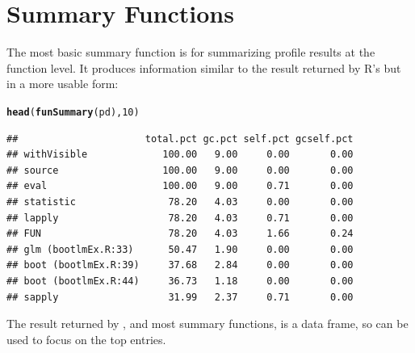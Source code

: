 \documentclass[nojss]{jss}\usepackage[]{graphicx}\usepackage[]{color}
\makeatletter
\newcommand{\hlnum}[1]{\textcolor[rgb]{0.686,0.059,0.569}{#1}}%
\newcommand{\hlstd}[1]{\textcolor[rgb]{0.345,0.345,0.345}{#1}}%
\newcommand{\hlkwd}[1]{\textcolor[rgb]{0.737,0.353,0.396}{\textbf{#1}}}%
\newenvironment{kframe}{%
 \def\at@end@of@kframe{}%
 \ifinner\ifhmode%
  \def\at@end@of@kframe{\end{minipage}}%
  \begin{minipage}{\columnwidth}%
 \fi\fi%
 \def\FrameCommand##1{\hskip\@totalleftmargin \hskip-\fboxsep
 \colorbox{shadecolor}{##1}\hskip-\fboxsep
     \hskip-\linewidth \hskip-\@totalleftmargin \hskip\columnwidth}%
 \MakeFramed {\advance\hsize-\width
   \@totalleftmargin\z@ \linewidth\hsize
   \@setminipage}}%
 {\par\unskip\endMakeFramed%
 \at@end@of@kframe}
\newenvironment{knitrout}{}{} %
\makeatother
\begin{document}
\section{Summary Functions}
The most basic summary function is  for summarizing
profile results at the function level. It produces information similar
to the result returned by R's  but in a more usable
form:
\begin{knitrout}\small
{}\color{fgcolor}\begin{kframe}
\begin{alltt}
\hlkwd{head}\hlstd{(}\hlkwd{funSummary}\hlstd{(pd),} \hlnum{10}\hlstd{)}
\end{alltt}
\begin{verbatim}
##                      total.pct gc.pct self.pct gcself.pct
## withVisible             100.00   9.00     0.00       0.00
## source                  100.00   9.00     0.00       0.00
## eval                    100.00   9.00     0.71       0.00
## statistic                78.20   4.03     0.00       0.00
## lapply                   78.20   4.03     0.71       0.00
## FUN                      78.20   4.03     1.66       0.24
## glm (bootlmEx.R:33)      50.47   1.90     0.00       0.00
## boot (bootlmEx.R:39)     37.68   2.84     0.00       0.00
## boot (bootlmEx.R:44)     36.73   1.18     0.00       0.00
## sapply                   31.99   2.37     0.71       0.00
\end{verbatim}
\end{kframe}
\end{knitrout}
The result returned by , and most summary functions,
is a data frame, so  can be used to focus on the top
entries. 
\end{document}
